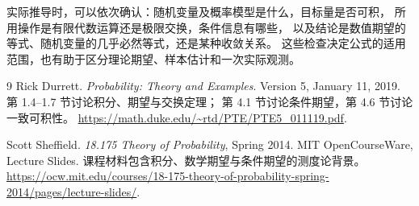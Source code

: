 \documentclass[UTF8,12pt,a4paper,fontset=fandol]{ctexart}
\begin{document}
实际推导时，可以依次确认：随机变量及概率模型是什么，目标量是否可积，
所用操作是有限代数运算还是极限交换，条件信息有哪些，
以及结论是数值期望的等式、随机变量的几乎必然等式，还是某种收敛关系。
这些检查决定公式的适用范围，也有助于区分理论期望、样本估计和一次实际观测。

\begin{thebibliography}{9}
Rick Durrett.
\textit{Probability: Theory and Examples}.
Version 5, January 11, 2019.
第 1.4--1.7 节讨论积分、期望与交换定理；
第 4.1 节讨论条件期望，第 4.6 节讨论一致可积性。
\url{https://math.duke.edu/~rtd/PTE/PTE5_011119.pdf}.

Scott Sheffield.
\textit{18.175 Theory of Probability}, Spring 2014.
MIT OpenCourseWare, Lecture Slides.
课程材料包含积分、数学期望与条件期望的测度论背景。
\url{https://ocw.mit.edu/courses/18-175-theory-of-probability-spring-2014/pages/lecture-slides/}.
\end{thebibliography}
\end{document}
